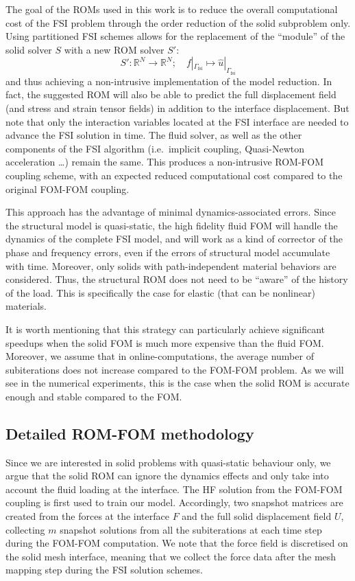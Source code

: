 \documentclass[11pt]{article}
\begin{document}
The goal of the ROMs used in this work is to reduce the overall computational cost of the FSI problem through the order reduction of the solid subproblem only. Using partitioned FSI schemes allows for the replacement of the ``module'' of the solid solver $S$ with a new ROM solver $S'$:
\begin{equation}
\tag{9}
S' : \mathbb{R}^{N} \to \mathbb{R}^{N};\quad f|_{\Gamma_{\mathrm{fsi}}} \mapsto \hat{u}|_{\Gamma_{\mathrm{fsi}}}
\end{equation}
and thus achieving a non-intrusive implementation of the model reduction. In fact, the suggested ROM will also be able to predict the full displacement field (and stress and strain tensor fields) in addition to the interface displacement. But note that only the interaction variables located at the FSI interface are needed to advance the FSI solution in time. The fluid solver, as well as the other components of the FSI algorithm (i.e.\ implicit coupling, Quasi-Newton acceleration \dots) remain the same. This produces a non-intrusive ROM-FOM coupling scheme, with an expected reduced computational cost compared to the original FOM-FOM coupling.

This approach has the advantage of minimal dynamics-associated errors. Since the structural model is quasi-static, the high fidelity fluid FOM will handle the dynamics of the complete FSI model, and will work as a kind of corrector of the phase and frequency errors, even if the errors of structural model accumulate with time. Moreover, only solids with path-independent material behaviors are considered. Thus, the structural ROM does not need to be ``aware'' of the history of the load. This is specifically the case for elastic (that can be nonlinear) materials.

It is worth mentioning that this strategy can particularly achieve significant speedups when the solid FOM is much more expensive than the fluid FOM. Moreover, we assume that in online-computations, the average number of subiterations does not increase compared to the FOM-FOM problem. As we will see in the numerical experiments, this is the case when the solid ROM is accurate enough and stable compared to the FOM.

\subsection{Detailed ROM-FOM methodology}

Since we are interested in solid problems with quasi-static behaviour only, we argue that the solid ROM can ignore the dynamics effects and only take into account the fluid loading at the interface. The HF solution from the FOM-FOM coupling is first used to train our model. Accordingly, two snapshot matrices are created from the forces at the interface $F$ and the full solid displacement field $U$, collecting $m$ snapshot solutions from all the subiterations at each time step during the FOM-FOM computation. We note that the force field is discretised on the solid mesh interface, meaning that we collect the force data after the mesh mapping step during the FSI solution schemes.
\end{document}
